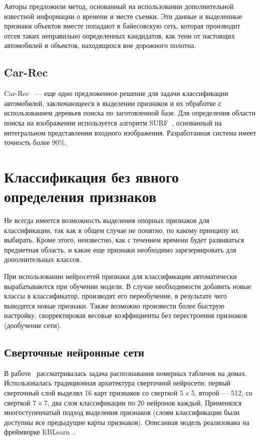 \documentclass[a4paper,14pt]{extarticle} %
\begin{document}
Авторы предложили метод, основанный на использовании дополнительной известной информации о времени и месте съемки. Эти данные и выделенные признаки объектов вместе попадают в байесовскую сеть, которая производит отсев таких неправильно определенных кандидатов, как тени от настоящих автомобилей и объектов, находящихся вне дорожного полотна. 

\subsection{Car-Rec}
\hspace{\parindent} Car-Rec~\cite{jang2011car} --- еще одно предложенное решение для задачи классификации автомобилей, заключающееся в выделении признаков и их обработке с использованием деревьев поиска по заготовленной базе. Для определения области поиска на изображении используется алгоритм SURF~\cite{bay2008speeded}, основанный на интегральном представлении входного изображения. Разработанная система имеет точность более 90\%.

\section{Классификация без явного определения признаков}
\hspace{\parindent} Не всегда имеется возможность выделения опорных признаков для классификации, так как в общем случае не понятно, по какому принципу их выбирать. Кроме этого, неизвестно, как с течением времени будет развиваться предметная область, и какие еще признаки необходимо зарезервировать для дополнительных классов. 

При использовании нейросетей признаки для классификации автоматически вырабатываются при обучении модели. В случае необходимости добавить новые классы в классификатор, производят его переобучение, в результате чего выводятся новые признаки. Также возможно произвести более быструю настройку, скорректировав весовые коэффициенты без перестроения признаков (дообучение сети).

\subsection{Сверточные нейронные сети}
\hspace{\parindent} В работе~\cite{sermanet2012convolutional} рассматривалась задача распознавания номерных табличек на домах. Использовалась традиционная архитектура сверточной нейросети: первый сверточный слой выделял 16 карт признаков со сверткой $5 \times 5$, второй --- 512, со сверткой $7 \times 7$, два слоя классификации по 20 нейронов каждый. Применялся многоступенчатый подход выделения признаков (слоям классификации были доступны все предыдущие карты признаков). Описанная модель реализована на фреймворке EBLearn~\cite{sermanet2009eblearn}.
\end{document}

